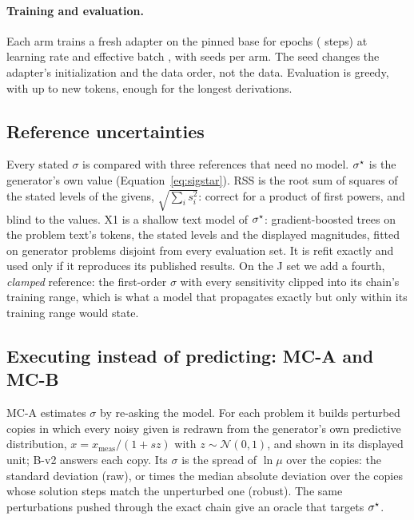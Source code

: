 \paragraph{Training and evaluation.}
Each arm trains a fresh adapter on the pinned base for  epochs ( steps) at
learning rate  and effective batch , with  seeds per arm.
The seed changes the adapter's initialization and the data order, not the data.
Evaluation is greedy, with up to  new tokens, enough for the longest derivations.



\subsection{Reference uncertainties}
\label{sec:comparators}

Every stated $\sigma$ is compared with three references that need no model.
$\sigma^{\star}$ is the generator's own value (Equation~\eqref{eq:sigstar}).
RSS is the root sum of squares of the stated levels of the givens, $\sqrt{\sum_i s_i^2}$: correct for a product of
first powers, and blind to the values.
X1 is a shallow text model of $\sigma^{\star}$: gradient-boosted trees on the problem text's tokens, the stated levels and
the displayed magnitudes, fitted on generator problems disjoint from every evaluation set.
It is refit exactly and used only if it reproduces its published results.
On the J set we add a fourth, \emph{clamped} reference: the first-order $\sigma$ with every sensitivity clipped into
its chain's training range, which is what a model that propagates exactly but only within its training range would
state.

\subsection{Executing instead of predicting: MC-A and MC-B}
\label{sec:mc}

MC-A estimates $\sigma$ by re-asking the model.
For each problem it builds  perturbed copies in which every noisy given is redrawn from the generator's own
predictive distribution, $x = x_{\text{meas}}/(1+s z)$ with $z \sim \mathcal{N}(0,1)$, and shown in its displayed
unit; B-v2 answers each copy.
Its $\sigma$ is the spread of $\ln\mu$ over the copies: the standard deviation (raw), or  times the median
absolute deviation over the copies whose solution steps match the unperturbed one (robust).
The same perturbations pushed through the exact chain give an oracle that targets $\sigma^{\star}$.

